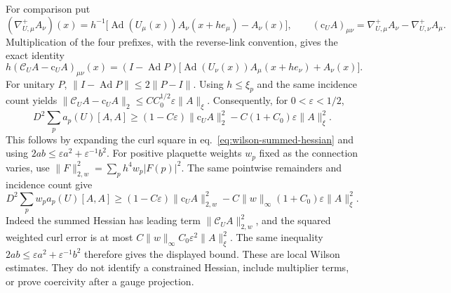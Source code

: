 \documentclass[11pt,letterpaper,reqno]{amsart}
\numberwithin{equation}{section}
\renewcommand{\eqref}[1]{\textup{eq.~\ref{#1}}}
\theoremstyle{definition}
\theoremstyle{remark}
\begin{document}
For comparison put
\[
 (\nabla^+_{U,\mu}A_\nu)(x)
 =h^{-1}\bigl[\operatorname{Ad}(U_\mu(x))A_\nu(x+he_\mu)
                         -A_\nu(x)\bigr],\qquad
 (\mathrm c_UA)_{\mu\nu}=\nabla^+_{U,\mu}A_\nu
                              -\nabla^+_{U,\nu}A_\mu.
\]
Multiplication of the four prefixes, with the reverse-link convention,
gives the exact identity
\begin{equation}\label{eq:wilson-curl-comparison}
 h(\mathcal C_UA-\mathrm c_UA)_{\mu\nu}(x)
 =(I-\operatorname{Ad}P)
     \bigl[\operatorname{Ad}(U_\nu(x))A_\mu(x+he_\nu)+A_\nu(x)\bigr].
\end{equation}
For unitary $P$, $\|I-\operatorname{Ad}P\|\le2\|P-I\|$.
Using $h\le\xi_p$ and the same incidence count yields
$\|\mathcal C_UA-\mathrm c_UA\|_2\le C C_0^{1/2}
\varepsilon\|A\|_\xi$. Consequently, for $0<\varepsilon<1/2$,
\begin{equation}\label{eq:wilson-curl-lower}
 D^2\sum_pa_p(U)[A,A]
 \ge(1-C\varepsilon)\|\mathrm c_UA\|_2^2
                          -C(1+C_0)\varepsilon\|A\|_\xi^2.
\end{equation}
This follows by expanding the curl square in
\eqref{eq:wilson-summed-hessian} and using
$2ab\le\varepsilon a^2+\varepsilon^{-1}b^2$.
For positive plaquette weights \(w_p\) fixed as the connection varies,
use \(\|F\|_{2,w}^2=\sum_p h^4w_p|F(p)|^2\). The same pointwise
remainders and incidence count give
\[
 D^2\sum_p w_pa_p(U)[A,A]
 \ge (1-C\varepsilon)\|\mathrm c_UA\|_{2,w}^2
       -C\|w\|_\infty(1+C_0)\varepsilon\|A\|_\xi^2.
\]
Indeed the summed Hessian has leading term
\(\|\mathcal C_UA\|_{2,w}^2\), and the squared weighted curl
error is at most \(C\|w\|_\infty C_0\varepsilon^2\|A\|_\xi^2\).
The same inequality \(2ab\le\varepsilon a^2+\varepsilon^{-1}b^2\)
therefore gives the displayed bound.
These are local Wilson estimates. They do not identify a constrained
Hessian, include multiplier terms, or prove coercivity after a gauge
projection.
\end{document}
